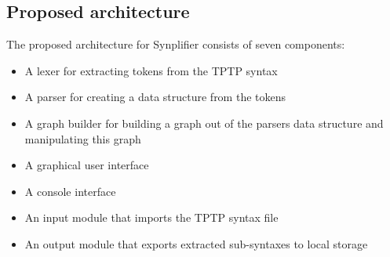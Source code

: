 \subsection{Proposed architecture}\label{sec:ConceptProposedArchitecture}
The proposed architecture for \ac{Synplifier} consists of seven components:
\begin{itemize}
\item A lexer for extracting tokens from the \ac{TPTP} syntax
\item A parser for creating a data structure from the tokens
\item A graph builder for building a graph out of the parsers data structure and manipulating this graph
\item A graphical user interface
\item A console interface 
\item An input module that imports the \ac{TPTP} syntax file
\item An output module that exports extracted sub-syntaxes to local storage
\end{itemize}


